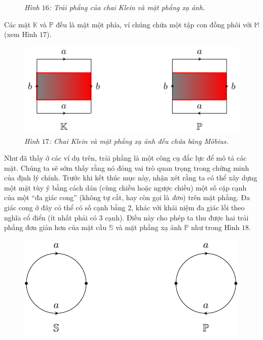 \begin{multicols}{2}
\begin{figure}[H]
		\caption{\small\textit{\color{duongvaotoanhoc}Hình $16$: Trải phẳng của chai Klein và mặt phẳng xạ ảnh.}}
		\vspace*{-10pt}
	\end{figure}
	Các mặt $\mathbb{K}$ và $\mathbb{P}$ đều là mặt một phía, ví chúng chứa một tập con đồng phôi với $\mathbb{M}$ (xem Hình $17$).
	\begin{figure}[H]
		\vspace*{-5pt}
		\centering\captionsetup{labelformat=empty, justification=centering}
		\includegraphics[width=1\linewidth]{H17.pdf}
		\caption{\small\textit{\color{duongvaotoanhoc}Hình $17$: Chai Klein và mặt phẳng xạ ảnh đều chứa băng M\"obius.}}
		\vspace*{-10pt}
	\end{figure}
	Như đã thấy ở các ví dụ trên, trải phẳng là một công cụ đắc lực để mô tả các mặt. Chúng ta sẽ sớm thấy rằng nó đóng vai trò quan trọng trong chứng minh của định lý chính. Trước khi kết thúc mục này, nhận xét rằng ta có thể xây dựng một mặt tùy ý bằng cách dán (cùng chiều hoặc ngược chiều) một số cặp cạnh của một ``đa giác cong'' (không tự cắt, hay còn gọi là {\it đơn}) trên mặt phẳng. Đa giác cong ở đây có thể có số cạnh bằng $2$, khác với khái niệm đa giác lồi theo nghĩa cổ điển (ít nhất phải có $3$ cạnh). Điều này cho phép ta thu được hai trải phẳng đơn giản hơn của mặt cầu $\mathbb{S}$ và mặt phẳng xạ ảnh $\mathbb{P}$ như trong Hình $18$.
	\begin{figure}[H]
		\vspace*{-5pt}
		\centering\captionsetup{labelformat=empty, justification=centering}
		\includegraphics[width=1\linewidth]{H18.pdf}

\end{figure}
\end{multicols}

